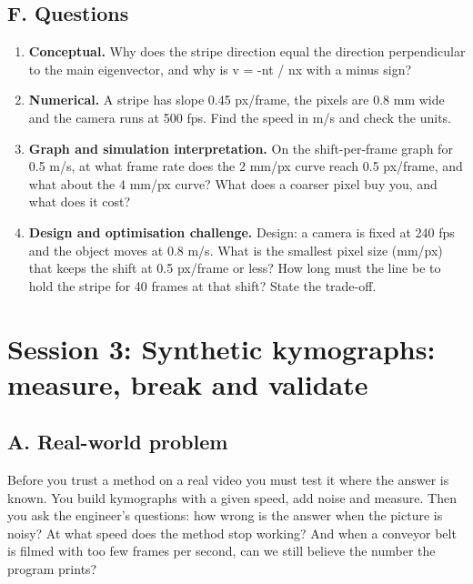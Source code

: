 \documentclass[11pt,a4paper]{article}
\begin{document}
\subsection*{F. Questions}
\begin{enumerate}[nosep]
\item \textbf{Conceptual.} Why does the stripe direction equal the direction perpendicular to the main eigenvector, and why is v = -nt / nx with a minus sign?
\item \textbf{Numerical.} A stripe has slope 0.45 px/frame, the pixels are 0.8 mm wide and the camera runs at 500 fps. Find the speed in m/s and check the units.
\item \textbf{Graph and simulation interpretation.} On the shift-per-frame graph for 0.5 m/s, at what frame rate does the 2 mm/px curve reach 0.5 px/frame, and what about the 4 mm/px curve? What does a coarser pixel buy you, and what does it cost?
\item \textbf{Design and optimisation challenge.} Design: a camera is fixed at 240 fps and the object moves at 0.8 m/s. What is the smallest pixel size (mm/px) that keeps the shift at 0.5 px/frame or less? How long must the line be to hold the stripe for 40 frames at that shift? State the trade-off.
\end{enumerate}

\section{Session 3: Synthetic kymographs: measure, break and validate}

\subsection*{A. Real-world problem}
Before you trust a method on a real video you must test it where the answer is known. You build kymographs with a given speed, add noise and measure. Then you ask the engineer's questions: how wrong is the answer when the picture is noisy? At what speed does the method stop working? And when a conveyor belt is filmed with too few frames per second, can we still believe the number the program prints?
\end{document}
